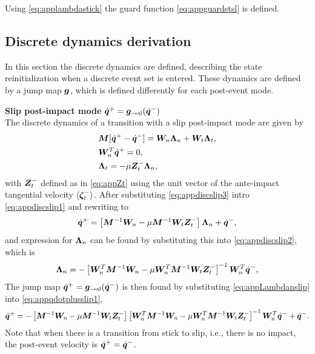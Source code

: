 \documentclass[../DC2017114Bouma.tex]{subfiles}
\begin{document}
Using \eqref{eq:applambdastick} the guard function \eqref{eq:appguardstsl} is defined.

\subsection{Discrete dynamics derivation}
In this section the discrete dynamics are defined, describing the state reinitialization when a discrete event set is entered. These dynamics are defined by a jump map ${\boldsymbol{g}}$, which is defined differently for each post-event mode.

\textbf{Slip post-impact mode} $\dot{{\boldsymbol{q}}}^+ = {\boldsymbol{g}}_{\rightarrow\text{sl}}(\dot{{\boldsymbol{q}}}^-)$\\
The discrete dynamics of a transition with a slip post-impact mode are given by
\begin{align}
&{\boldsymbol{M}}[\dot{{\boldsymbol{q}}}^+ - \dot{{\boldsymbol{q}}}^-] = {\boldsymbol{W}}_{n}\boldsymbol{\Lambda}_{n} + {\boldsymbol{W}}_{t}\boldsymbol{\Lambda}_{t},\label{eq:appdiscslip1}\\
&{\boldsymbol{W}}^T_{n}\dot{{\boldsymbol{q}}}^+ = 0,\label{eq:appdiscslip2}\\
&\boldsymbol{\Lambda}_{t} = -\mu{\boldsymbol{Z}}^{-}_{t}\boldsymbol{\Lambda}_{n},\label{eq:appdiscslip3}
\end{align}
with ${\boldsymbol{Z}}^{-}_{t}$ defined as in \eqref{eq:appZt} using the unit vector of the ante-impact tangential velocity $\langle\boldsymbol{\zeta}_{t}^-\rangle$. After substituting \eqref{eq:appdiscslip3} intro \eqref{eq:appdiscslip1} and rewriting to
\begin{align}
\dot{{\boldsymbol{q}}}^+ = \left[{\boldsymbol{M}}^{-1}{\boldsymbol{W}}_{n} - \mu{\boldsymbol{M}}^{-1}{\boldsymbol{W}}_{t}{\boldsymbol{Z}}^-_{t}\right]\boldsymbol{\Lambda}_{n} + \dot{{\boldsymbol{q}}}^-,\label{eq:appqdotplusslip1}
\end{align}
and expression for $\boldsymbol{\Lambda}_n$ can be found by substituting this into \eqref{eq:appdiscslip2}, which is
\begin{align}
\boldsymbol{\Lambda}_{n} = -\left[{\boldsymbol{W}}^T_{n}{\boldsymbol{M}}^{-1}{\boldsymbol{W}}_{n}- \mu{\boldsymbol{W}}^T_{n}{\boldsymbol{M}}^{-1}{\boldsymbol{W}}_{t}{\boldsymbol{Z}}^-_{t}\right]^{-1}{\boldsymbol{W}}^T_{n}\dot{{\boldsymbol{q}}}^-,\label{eq:appLambdanslip}
\end{align}
The jump map $\dot{{\boldsymbol{q}}}^+ = {\boldsymbol{g}}_{\rightarrow\text{sl}}(\dot{{\boldsymbol{q}}}^-)$ is then found by substituting \eqref{eq:appLambdanslip} into \eqref{eq:appqdotplusslip1},
\begin{align}
\dot{{\boldsymbol{q}}}^+ = -\left[{\boldsymbol{M}}^{-1}{\boldsymbol{W}}_{n} - \mu{\boldsymbol{M}}^{-1}{\boldsymbol{W}}_{t}{\boldsymbol{Z}}^-_{t}\right]\left[{\boldsymbol{W}}^T_{n}{\boldsymbol{M}}^{-1}{\boldsymbol{W}}_{n}- \mu{\boldsymbol{W}}^T_{n}{\boldsymbol{M}}^{-1}{\boldsymbol{W}}_{t}{\boldsymbol{Z}}^-_{t}\right]^{-1}{\boldsymbol{W}}^T_{n}\dot{{\boldsymbol{q}}}^- + \dot{{\boldsymbol{q}}}^-.\label{eq:appgslip}
\end{align}
Note that when there is a transition from stick to slip, i.e., there is no impact, the post-event velocity is $\dot{{\boldsymbol{q}}}^+ = \dot{{\boldsymbol{q}}}^-$.
\end{document}
